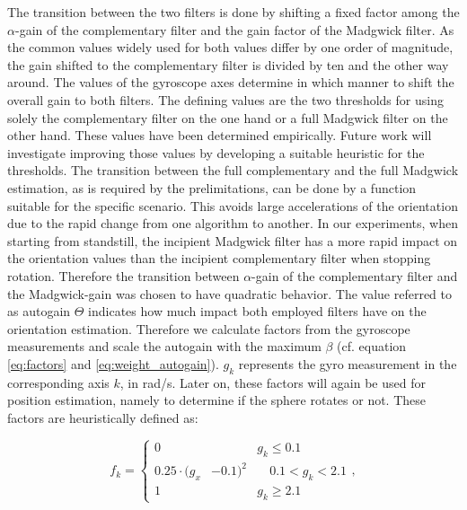\documentclass[letterpaper, 10 pt, conference]{ieeeconf}  %
\begin{document}
The transition between the two filters is done by shifting a fixed factor among the $\alpha$-gain of the complementary filter and the gain factor of the Madgwick filter.
 As the common values widely used for both values differ by one order of magnitude, the gain shifted to the complementary filter is divided by ten and the other way around.
 The values of the gyroscope axes determine in which manner to shift the overall gain to both filters. 
 The defining values are the two thresholds for using solely the complementary filter on the one hand or a full Madgwick filter on the other hand. 
 These values have been determined empirically.
 Future work will investigate improving those values by developing a suitable heuristic for the thresholds.
 The transition between the full complementary and the full Madgwick estimation, as is required by the prelimitations,  can be done by a function suitable for the specific scenario.
 This avoids large accelerations of the orientation due to the rapid change from one algorithm to another.
 In our experiments, when starting from standstill, the incipient Madgwick filter has a more rapid impact on the orientation values than the incipient complementary filter when stopping rotation. 
Therefore the transition between $\alpha$-gain of the complementary filter and the Madgwick-gain was chosen to have quadratic behavior. 
The value referred to as autogain $\Theta$ indicates how much impact both employed filters have on the orientation estimation. 
Therefore we calculate factors from the gyroscope measurements and scale the autogain with the maximum $\beta$ (cf. equation \ref{eq:factors} and \ref{eq:weight_autogain}).
$g_{k}$ represents the gyro measurement in the corresponding axis $k$, in rad/s. Later on, these factors will again be used for position estimation, namely to determine if the sphere rotates or not.
These factors are heuristically defined as:

\begin{equation}
f_k =
\left\{
\begin{aligned}
0& & g_k \leq 0.1  \\ 
0.25\cdot (g_x&-0.1)^2& \quad 0.1< g_k <2.1 \\
 1& & g_k \geq 2.1
\end{aligned}
\label{eq:factors}
\right. ,
\end{equation}
\end{document}
